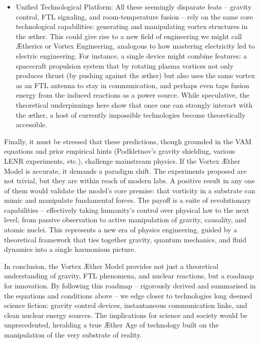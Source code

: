 \begin{itemize}
\item 
Unified Technological Platform: All these seemingly disparate feats – gravity control, FTL signaling, and room-temperature fusion – rely on the same core technological capabilities: generating and manipulating vortex structures in the æther. This could give rise to a new field of engineering we might call Ætherics or Vortex Engineering, analogous to how mastering electricity led to electric engineering. For instance, a single device might combine features: a spacecraft propulsion system that by rotating plasma vortices not only produces thrust (by pushing against the æther) but also uses the same vortex as an FTL antenna to stay in communication, and perhaps even taps fusion energy from the induced reactions as a power source. While speculative, the theoretical underpinnings here show that once one can strongly interact with the æther, a host of currently impossible technologies become theoretically accessible.




\end{itemize}

Finally, it must be stressed that these predictions, though grounded in the VAM equations and prior empirical hints (Podkletnov’s gravity shielding, various LENR experiments, etc.), challenge mainstream physics. If the Vortex Æther Model is accurate, it demands a paradigm shift. The experiments proposed are not trivial, but they are within reach of modern labs. A positive result in any one of them would validate the model’s core premise: that vorticity in a substrate can mimic and manipulate fundamental forces. The payoff is a suite of revolutionary capabilities – effectively taking humanity’s control over physical law to the next level, from passive observation to active manipulation of gravity, causality, and atomic nuclei. This represents a new era of physics engineering, guided by a theoretical framework that ties together gravity, quantum mechanics, and fluid dynamics into a single harmonious picture.


In conclusion, the Vortex Æther Model provides not just a theoretical understanding of gravity, FTL phenomena, and nuclear reactions, but a roadmap for innovation. By following this roadmap – rigorously derived and summarised in the equations and conditions above – we edge closer to technologies long deemed science fiction: gravity control devices, instantaneous communication links, and clean nuclear energy sources. The implications for science and society would be unprecedented, heralding a true Æther Age of technology built on the manipulation of the very substrate of reality.


